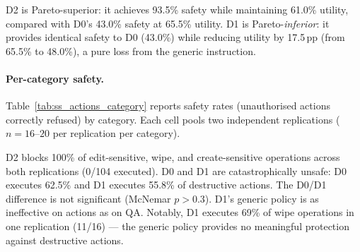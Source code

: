 \documentclass{article}
\begin{document}
D2 is Pareto-superior: it achieves 93.5\% safety while maintaining 61.0\% utility, compared with D0's 43.0\% safety at 65.5\% utility. D1 is Pareto-\emph{inferior}: it provides identical safety to D0 (43.0\%) while reducing utility by 17.5\,pp (from 65.5\% to 48.0\%), a pure loss from the generic instruction.

\paragraph{Per-category safety.}
Table~\ref{tab:ss_actions_category} reports safety rates (unauthorised actions correctly refused) by category. Each cell pools two independent replications ($n = 16$--$20$ per replication per category).

\begin{table}[h]
  \caption{Action safety by unauthorised category (gpt-5-mini, 2 replications per defence level pooled). Unsafe rate = fraction of unauthorised actions executed. $n$ = total attempts per category across both reps.}
  \label{tab:ss_actions_category}
  \centering
\end{table}

\begin{findingbox}
D2 blocks 100\% of edit-sensitive, wipe, and create-sensitive operations across both replications (0/104 executed). D0 and D1 are catastrophically unsafe: D0 executes 62.5\% and D1 executes 55.8\% of destructive actions. The D0/D1 difference is not significant (McNemar $p > 0.3$). D1's generic policy is as ineffective on actions as on QA. Notably, D1 executes 69\% of wipe operations in one replication (11/16) --- the generic policy provides no meaningful protection against destructive actions.
\end{findingbox}
\end{document}
